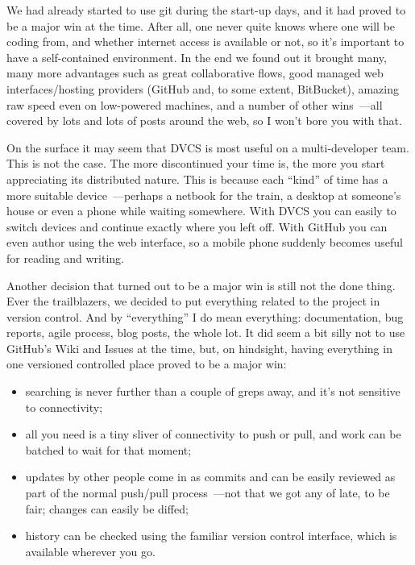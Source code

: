 \documentclass{book}
\begin{document}
We had already started to use git during the start-up days, and it had
proved to be a major win at the time. After all, one never quite knows
where one will be coding from, and whether internet access is
available or not, so it's important to have a self-contained
environment. In the end we found out it brought many, many more
advantages such as great collaborative flows, good managed web
interfaces/hosting providers (GitHub and, to some extent, BitBucket),
amazing raw speed even on low-powered machines, and a number of other
wins~---all covered by lots and lots of posts around the web, so I
won't bore you with that.

On the surface it may seem that DVCS is most useful on a
multi-developer team. This is not the case. The more discontinued your
time is, the more you start appreciating its distributed nature. This
is because each ``kind'' of time has a more suitable device~---perhaps
a netbook for the train, a desktop at someone's house or even a phone
while waiting somewhere. With DVCS you can easily to switch devices
and continue exactly where you left off. With GitHub you can even
author using the web interface, so a mobile phone suddenly becomes
useful for reading and writing.

Another decision that turned out to be a major win is still not the
done thing. Ever the trailblazers, we decided to put everything
related to the project in version control. And by ``everything'' I do
mean everything: documentation, bug reports, agile process, blog
posts, the whole lot. It did seem a bit silly not to use GitHub's Wiki
and Issues at the time, but, on hindsight, having everything in one
versioned controlled place proved to be a major win:

\begin{itemize}
\item searching is never further than a couple of greps away, and it's
  not sensitive to connectivity;
\item all you need is a tiny sliver of connectivity to push or pull,
  and work can be batched to wait for that moment;
\item updates by other people come in as commits and can be easily
  reviewed as part of the normal push/pull process~---not that we got
  any of late, to be fair; changes can easily be diffed;
\item history can be checked using the familiar version control
  interface, which is available wherever you go.
\end{itemize}
\end{document}
